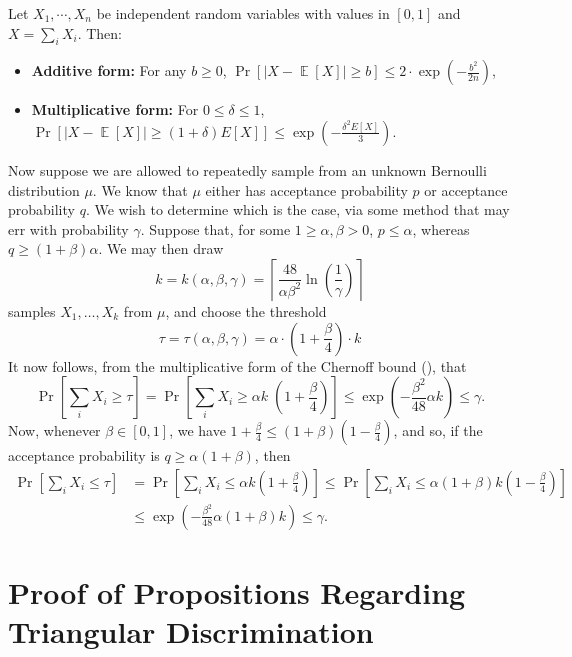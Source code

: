 \documentclass[11pt,letterpaper]{article}
\DeclareMathOperator*{\E}{\mathbb{E}}
\renewcommand{\geq}{\geqslant}
\renewcommand{\leq}{\leqslant}
\renewcommand{\le}{\leq}
\renewcommand{\ge}{\geq}
\theoremstyle{definition}
\begin{document}
\begin{proposition}\label{lem:chernoff}
    Let $X_1, \cdots, X_n$ be independent random variables with values in $[0,1]$ and $X = \sum_i X_i$. Then: \begin{itemize}
        \item \textbf{Additive form: } For any $b \ge 0$, $\Pr[|X - \E[X]| \ge b] \le 2\cdot \exp\left(-\frac{b^2}{2n}\right)$, \label{itm:chernoff-add}

        \item \textbf{Multiplicative form: } For $0 \le \delta \le 1$, $\Pr[|X - \E[X]| \ge (1+\delta) E[X]] \le \exp\left(-\frac{\delta^2 E[X]}{3}\right)$.\label{itm:chernoff-mult}
    \end{itemize}
\end{proposition}

\bigskip\noindent
Now suppose we are allowed to repeatedly sample from an unknown Bernoulli distribution $\mu$. We know that $\mu$ either has acceptance probability $p$ or acceptance probability $q$. We wish to determine which is the case, via some method that may err with probability $\gamma$. Suppose that, for some $1 \ge \alpha,\beta > 0$, $p \le \alpha$, whereas $q \ge (1 + \beta) \alpha$. We may then draw 
\[
k = k(\alpha, \beta, \gamma) = \left\lceil\frac{48}{\alpha \beta^2} \ln\left(\frac{1}{\gamma}\right)\right\rceil
\]
samples $X_1, \ldots, X_k$ from $\mu$, and choose the threshold
\[
\tau = \tau(\alpha, \beta, \gamma) = \alpha \cdot \left(1 + \frac{\beta}{4}\right) \cdot k 
\]
It now follows, from the multiplicative form of the Chernoff bound (), that
\[
\Pr[\sum_i X_i \ge \tau] = \Pr[\sum_i X_i \ge \alpha k \;\left(1 + \frac\beta4\right)] \le \exp\left(- \frac{\beta^2}{48} \alpha k \right) \le \gamma.
\]
Now, whenever $\beta \in [0,1]$, we have $1 + \frac\beta4 \le (1 + \beta) ( 1 - \frac{\beta}{4})$, and so, if the acceptance probability is $q \ge \alpha(1 + \beta)$, then
\begin{align*}
\Pr[\sum_i X_i \le \tau] %
& = \Pr[\sum_i X_i \le \alpha k\left(1 + \frac\beta4\right)] \le \Pr[\sum_i X_i \le \alpha (1 + \beta) k\left(1 - \frac\beta4\right)] \\
& \le \exp\left(- \frac{\beta^2}{48} \alpha (1+\beta) k \right) \le \gamma.
\end{align*}





\section{Proof of Propositions Regarding Triangular Discrimination} \label{sec:td-props}
\end{document}
